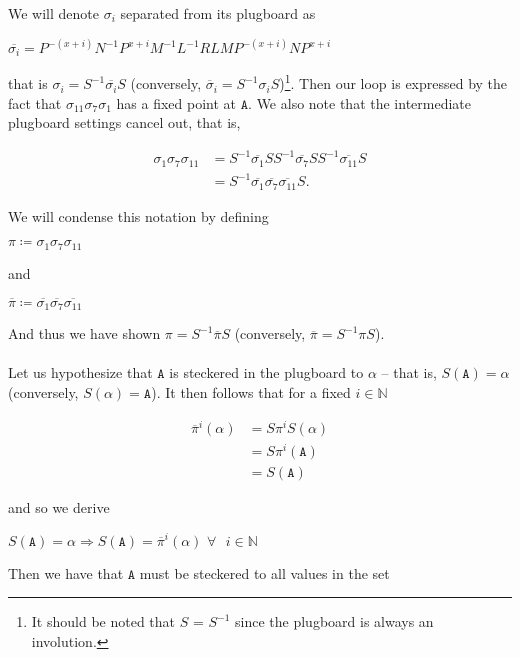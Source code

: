 We will denote $\sigma_i$ separated from its plugboard as
\begin{center}
  $\overline{\sigma_i} =
  P^{-(x+i)}N^{-1}P^{x+i}M^{-1}L^{-1}RLMP^{-(x+i)}NP^{x+i}$
\end{center}
\noindent that is $\sigma_i = S^{-1}\overline{\sigma_i}S$
(conversely, $\overline\sigma_i = S^{-1}\sigma_iS$)\footnote{It
  should be noted that $S$ = $S^{-1}$ since the plugboard is always an
involution.}.
Then our loop is expressed by the fact that
$\sigma_{11}\sigma_7\sigma_1$ has a fixed point at $\texttt{A}$.
We also note that the intermediate plugboard settings cancel out, that is,
\begin{center}
  \begin{align*}
    \sigma_{1}\sigma_7\sigma_{11} & =
    S^{-1}\overline{\sigma_{1}}SS^{-1}\overline{\sigma_7}SS^{-1}\overline{\sigma_{11}}S
    \\&= S^{-1}
    \overline{\sigma_{1}}\overline{\sigma_7}\overline{\sigma_{11}}
    S.
  \end{align*}
\end{center}
We will condense this notation by defining
\begin{center}
  $\pi \coloneq \sigma_{1}\sigma_7\sigma_{11}$
\end{center}
and
\begin{center}
  $\overline{\pi} \coloneq
  \overline{\sigma_{1}}\overline{\sigma_7}\overline{\sigma_{11}}$
\end{center}
And thus we have shown $\pi = S^{-1}\overline{\pi}S$ (conversely,
$\overline\pi = S^{-1}\pi S$).
\\\\Let us hypothesize that $\texttt{A}$ is steckered in the plugboard to
$\alpha$ -- that is, $S(\texttt{A}) = \alpha$ (conversely, $S(\alpha)
= \texttt{A}$).
It then follows that for a fixed $i\in\mathbb{N}$
\begin{center}
  \begin{align*}
    \overline{\pi}^i(\alpha) & = S\pi^i S(\alpha)
    \\&= S \pi^i(\texttt{A})
    \\&= S(\texttt{A})
  \end{align*}
\end{center}
and so we derive
\begin{center}
  $S(\texttt{A}) = \alpha \Rightarrow S(\texttt{A}) =
  \overline{\pi}^i(\alpha)\text{
  }\forall\text{ }i\in\mathbb{N}$
\end{center}
Then we have that $\texttt{A}$ must be steckered to all values in the set
